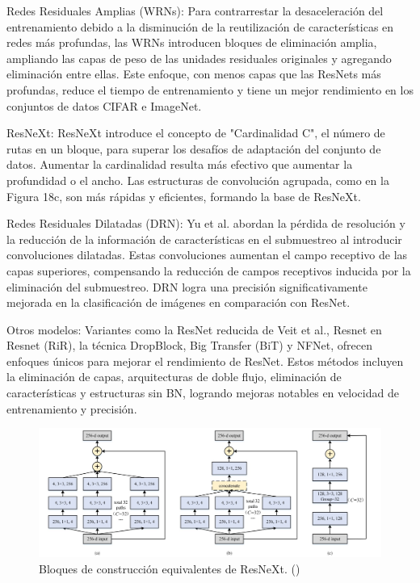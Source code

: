 \begin{itemize}
 Redes Residuales Amplias (WRNs): Para contrarrestar la desaceleración del entrenamiento debido a la disminución de la reutilización de características en redes más profundas, las WRNs introducen bloques de eliminación amplia, ampliando las capas de peso de las unidades residuales originales y agregando eliminación entre ellas. Este enfoque, con menos capas que las ResNets más profundas, reduce el tiempo de entrenamiento y tiene un mejor rendimiento en los conjuntos de datos CIFAR e ImageNet.
 
 ResNeXt: ResNeXt introduce el concepto de "Cardinalidad C", el número de rutas en un bloque, para superar los desafíos de adaptación del conjunto de datos. Aumentar la cardinalidad resulta más efectivo que aumentar la profundidad o el ancho. Las estructuras de convolución agrupada, como en la Figura 18c, son más rápidas y eficientes, formando la base de ResNeXt.
 
 Redes Residuales Dilatadas (DRN): Yu et al. abordan la pérdida de resolución y la reducción de la información de características en el submuestreo al introducir convoluciones dilatadas. Estas convoluciones aumentan el campo receptivo de las capas superiores, compensando la reducción de campos receptivos inducida por la eliminación del submuestreo. DRN logra una precisión significativamente mejorada en la clasificación de imágenes en comparación con ResNet.
 
 Otros modelos: Variantes como la ResNet reducida de Veit et al., Resnet en Resnet (RiR), la técnica DropBlock, Big Transfer (BiT) y NFNet, ofrecen enfoques únicos para mejorar el rendimiento de ResNet. Estos métodos incluyen la eliminación de capas, arquitecturas de doble flujo, eliminación de características y estructuras sin BN, logrando mejoras notables en velocidad de entrenamiento y precisión.
  
  \begin{figure}[H]
  	\begin{center}
  		\includegraphics[width=1\textwidth]{2/figures/cnn7.jpeg}
  		\caption{Bloques de construcción equivalentes de ResNeXt.
  			(\cite{tecnica2})}
  	\end{center}
  \end{figure}
  

\end{itemize}
